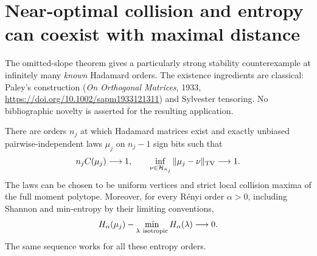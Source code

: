 \section{Near-optimal collision and entropy can coexist with maximal distance}
\label{sec:relative-sequence}

The omitted-slope theorem gives a particularly strong stability
counterexample at infinitely many \emph{known} Hadamard orders.
The existence ingredients are classical: Paley's construction
(\emph{On Orthogonal Matrices}, 1933,
\url{https://doi.org/10.1002/sapm1933121311}) and Sylvester tensoring.
No bibliographic novelty is asserted for the resulting application.

\begin{theorem}
\label{thm:relative-no-stability}
There are orders $n_j$ at which Hadamard matrices exist and exactly
unbiased pairwise-independent laws $\mu_j$ on $n_j-1$ sign bits such that
\[
 n_j C(\mu_j)\longrightarrow1,\qquad
 \inf_{\nu\in\mathcal H_{n_j}}\|\mu_j-\nu\|_{\rm TV}
 \longrightarrow1.
\]
The laws can be chosen to be uniform vertices and strict local
collision maxima of the full moment polytope. Moreover, for every
R\'enyi order $\alpha>0$, including Shannon and min-entropy by their
limiting conventions,
\[
 H_\alpha(\mu_j)-\min_{\lambda\ {\rm isotropic}}H_\alpha(\lambda)
 \longrightarrow0.
\]
The same sequence works for all these entropy orders.
\end{theorem}
